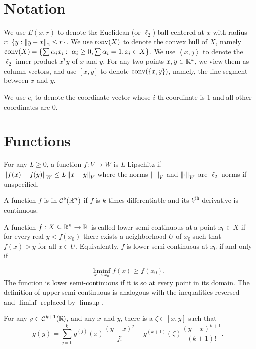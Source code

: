 
\section*{Notation}

We use $B(x,r)$ to denote the Euclidean (or $\ell_{2}$) ball centered
at $x$ with radius $r$: $\left\{ y:\left\Vert y-x\right\Vert_{2}\le r\right\} $.
We use $\mathrm{conv}(X)$ to denote the convex hull of $X$, namely $\conv(X)=\{\sum\alpha_{i}x_{i}:\ \alpha_{i}\geq0,\sum\alpha_{i}=1,x_{i}\in X\}$.
We use $\left\langle x,y\right\rangle $ to denote the $\ell_{2}$
inner product $x^{T}y$ of $x$ and $y$. For any two points $x,y\in\mathbb{R}^{n}$,
we view them as column vectors, and use $[x,y]$ to denote $\mathrm{conv}(\{x,y\})$,
namely, the line segment between $x$ and $y$. 

We use $e_{i}$ to denote the coordinate vector whose $i$-th coordinate
is 1 and all other coordinates are $0$.


\section*{Functions}
\begin{defn}
For any $L\geq0$, a function $f:V\rightarrow W$ is $L$-Lipschitz
if $\left\Vert f(x)-f(y)\right\Vert_{W}\leq L\left\Vert x-y\right\Vert_{V}$ where the norms $\left\Vert \cdot\right\Vert_{V}$
and $\left\Vert \cdot\right\Vert_{W}$ are $\ell_{2}$ norms if unspecified.
\end{defn}

\begin{defn}
A function $f$ is in $\mathcal{C}^{k}(\mathbb{R}^{n})$ if $f$ is $k$-times
differentiable and its $k^{\mathrm{th}}$ derivative is continuous.
\end{defn}

\begin{defn}
\label{def:lower-semi}A function ${\displaystyle f:X\subseteq\mathbb{R}^{n}\to\mathbb{R}}$
is called lower semi-continuous at a point $x_{0}\in X$ if for every
real $y<f(x_{0})$ there exists a neighborhood $U$ of $x_{0}$ such
that $f(x)>y$ for all $x\in U$. Equivalently, $f$ is lower semi-continuous
at $x_{0}$ if and only if 

\[
{\displaystyle \liminf_{x\to x_{0}}f(x)\geq f(x_{0})}.
\]
The function is lower semi-continuous if it is so at every point in
its domain. The definition of upper semi-continuous is analogous with
the inequalities reversed and $\liminf$ replaced by $\limsup$. 
\end{defn}

\begin{thm}
\label{thm:taylor_expansion}For any $g\in\mathcal{C}^{k+1}(\mathbb{R})$,
and any $x$ and $y$, there is a $\zeta\in[x,y]$ such that
\[
g(y)=\sum^{k}_{j=0}g^{(j)}(x)\frac{(y-x)^{j}}{j!}+g^{(k+1)}(\zeta)\frac{(y-x)^{k+1}}{(k+1)!}.
\]
\end{thm}

